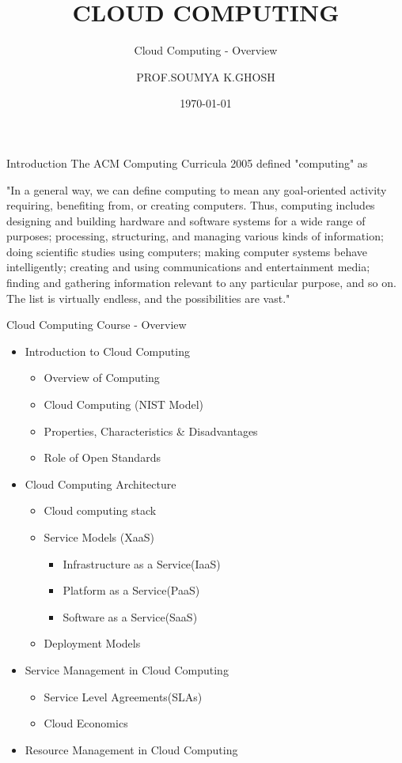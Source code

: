 \documentclass{SKP-beamer}
\title[Cloud Computing]{CLOUD COMPUTING}
\subtitle{Cloud Computing - Overview}
\author{PROF.SOUMYA K.GHOSH}
\institute[SIT]{
  SILICON INSTITUTE OF TECHNOLOGY\\
  SAMBALPUR
}
\date{\today}
\begin{document}
\begin{frame}
  \titlepage
\end{frame}

\begin{frame}{Introduction}
  The ACM Computing Curricula 2005 defined "computing" as
  
  "In a general way, we can define computing to mean any goal-oriented activity  requiring,  benefiting  from,  or  creating  computers.  Thus, computing includes designing and building hardware and software systems for a wide range of purposes; processing, structuring, and managing various kinds of information; doing scientific studies using computers; making computer systems behave intelligently; creating and  using  communications  and  entertainment  media;  finding  and gathering information relevant to any particular purpose, and so on. The list is virtually endless, and the possibilities are vast."
  
\end{frame}



\begin{frame}{Cloud Computing Course - Overview}
	\begin{itemize}
		\item  Introduction to Cloud Computing
		\begin{itemize}
			\item  Overview of Computing
			\item Cloud Computing (NIST Model)
			\item Properties, Characteristics & Disadvantages
			\item Role of Open Standards
			
		\end{itemize}
		\item Cloud Computing Architecture
			\begin{itemize}
			\item  Cloud computing stack
            \item  Service Models (XaaS)
		        \begin{itemize}
		        	\item  Infrastructure as a Service(IaaS)
		        	\item  Platform as a Service(PaaS)
		        	\item Software as a Service(SaaS)
		        \end{itemize}
			\item  Deployment Models
	    	\end{itemize}
		\item Service Management in Cloud Computing
		        	\begin{itemize}
		        	\item  Service Level Agreements(SLAs)
		        	\item  Cloud Economics
		        	 \end{itemize}
		 \item Resource Management in Cloud 
		 Computing
		 
	\end{itemize}
	
\end{frame}
\end{document}
